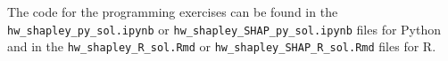 \documentclass[a4paper]{article}
\begin{document}

The code for the programming exercises can be found in the \texttt{hw\_shapley\_py\_sol.ipynb} or \texttt{hw\_shapley\_SHAP\_py\_sol.ipynb} files for Python and in the \texttt{hw\_shapley\_R\_sol.Rmd} or \texttt{hw\_shapley\_SHAP\_R\_sol.Rmd} files for R.



\dlz




% 


% 
\end{document}
